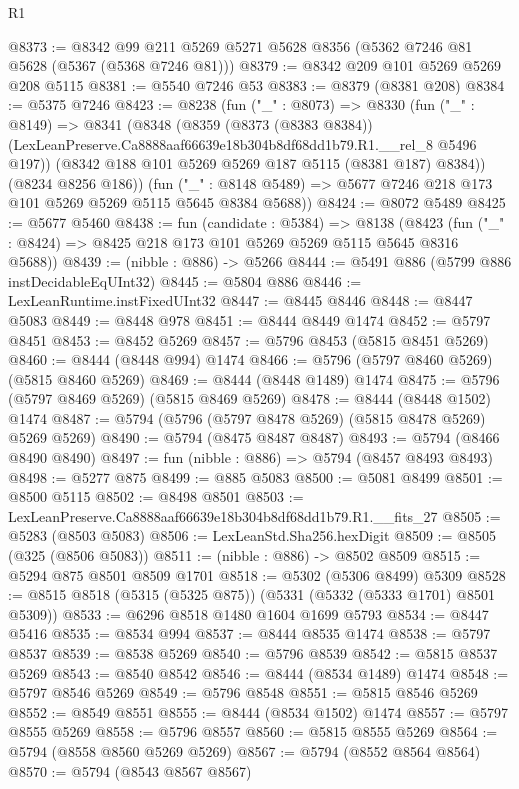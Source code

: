 \begin{lexlean}{R1}
\begin{coremodule}
@8373 := @8342 @99 @211 @5269 @5271 @5628 @8356 (@5362 @7246 @81 @5628 (@5367 (@5368 @7246 @81)))
@8379 := @8342 @209 @101 @5269 @5269 @208 @5115
@8381 := @5540 @7246 @53
@8383 := @8379 (@8381 @208)
@8384 := @5375 @7246
@8423 := @8238
    (fun ("_" : @8073) =>
    @8330
      (fun ("_" : @8149) =>
      @8341
        (@8348
          (@8359
            (@8373 (@8383 @8384))
            (LexLeanPreserve.Ca8888aaf66639e18b304b8df68dd1b79.R1.__rel_8 @5496 @197))
          (@8342 @188 @101 @5269 @5269 @187 @5115 (@8381 @187) @8384))
        (@8234 @8256 @186))
      (fun ("_" : @8148 @5489) => @5677 @7246 @218 @173 @101 @5269 @5269 @5115 @5645 @8384 @5688))
@8424 := @8072 @5489
@8425 := @5677 @5460
@8438 := fun (candidate : @5384) =>
  @8138 (@8423 (fun ("_" : @8424) => @8425 @218 @173 @101 @5269 @5269 @5115 @5645 @8316 @5688))
@8439 := (nibble : @886) -> @5266
@8444 := @5491 @886 (@5799 @886 instDecidableEqUInt32)
@8445 := @5804 @886
@8446 := LexLeanRuntime.instFixedUInt32
@8447 := @8445 @8446
@8448 := @8447 @5083
@8449 := @8448 @978
@8451 := @8444 @8449 @1474
@8452 := @5797 @8451
@8453 := @8452 @5269
@8457 := @5796 @8453 (@5815 @8451 @5269)
@8460 := @8444 (@8448 @994) @1474
@8466 := @5796 (@5797 @8460 @5269) (@5815 @8460 @5269)
@8469 := @8444 (@8448 @1489) @1474
@8475 := @5796 (@5797 @8469 @5269) (@5815 @8469 @5269)
@8478 := @8444 (@8448 @1502) @1474
@8487 := @5794 (@5796 (@5797 @8478 @5269) (@5815 @8478 @5269) @5269 @5269)
@8490 := @5794 (@8475 @8487 @8487)
@8493 := @5794 (@8466 @8490 @8490)
@8497 := fun (nibble : @886) => @5794 (@8457 @8493 @8493)
@8498 := @5277 @875
@8499 := @885 @5083
@8500 := @5081 @8499
@8501 := @8500 @5115
@8502 := @8498 @8501
@8503 := LexLeanPreserve.Ca8888aaf66639e18b304b8df68dd1b79.R1.__fits_27
@8505 := @5283 (@8503 @5083)
@8506 := LexLeanStd.Sha256.hexDigit
@8509 := @8505 (@325 (@8506 @5083))
@8511 := (nibble : @886) -> @8502 @8509
@8515 := @5294 @875 @8501 @8509 @1701
@8518 := @5302 (@5306 @8499) @5309
@8528 := @8515 @8518 (@5315 (@5325 @875)) (@5331 (@5332 (@5333 @1701) @8501 @5309))
@8533 := @6296 @8518 @1480 @1604 @1699 @5793
@8534 := @8447 @5416
@8535 := @8534 @994
@8537 := @8444 @8535 @1474
@8538 := @5797 @8537
@8539 := @8538 @5269
@8540 := @5796 @8539
@8542 := @5815 @8537 @5269
@8543 := @8540 @8542
@8546 := @8444 (@8534 @1489) @1474
@8548 := @5797 @8546 @5269
@8549 := @5796 @8548
@8551 := @5815 @8546 @5269
@8552 := @8549 @8551
@8555 := @8444 (@8534 @1502) @1474
@8557 := @5797 @8555 @5269
@8558 := @5796 @8557
@8560 := @5815 @8555 @5269
@8564 := @5794 (@8558 @8560 @5269 @5269)
@8567 := @5794 (@8552 @8564 @8564)
@8570 := @5794 (@8543 @8567 @8567)

\end{coremodule}
\end{lexlean}
